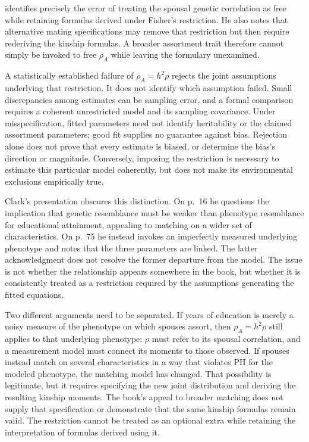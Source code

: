 \citet[p.~19]{Goldberger1978} identifies precisely the error of treating
the spousal genetic correlation as free while retaining formulas
derived under Fisher's restriction. He also notes that alternative
mating specifications may remove that restriction but then require
rederiving the kinship formulas. A broader assortment trait therefore
cannot simply be invoked to free $\rho_A$ while leaving the formulary
unexamined.

A statistically established failure of $\rho_A=h^2\rho$ rejects the
joint assumptions underlying that restriction. It does not identify
which assumption failed. Small discrepancies among estimates can be
sampling error, and a formal comparison requires a coherent unrestricted
model and its sampling covariance. Under misspecification, fitted
parameters need not identify heritability or the claimed assortment
parameters; good fit supplies no guarantee against bias. Rejection
alone does not prove that every estimate is biased, or determine the
bias's direction or magnitude. Conversely, imposing the restriction is
necessary to estimate this particular model coherently, but does not
make its environmental exclusions empirically true.

Clark's presentation obscures this distinction. On p.~16 he questions
the implication that genetic resemblance must be weaker than phenotype
resemblance for educational attainment, appealing to matching on a wider
set of characteristics. On p.~75 he instead invokes an imperfectly
measured underlying phenotype and notes that the three parameters are
linked. The latter acknowledgment does not resolve the former departure
from the model. The issue is not whether the relationship appears
somewhere in the book, but whether it is consistently treated as a
restriction required by the assumptions generating the fitted equations.

Two different arguments need to be separated. If years of education
is merely a noisy measure of the phenotype on which spouses assort,
then $\rho_A=h^2\rho$ still applies to that underlying phenotype:
$\rho$ must refer to its spousal correlation, and a measurement model
must connect its moments to those observed. If spouses instead match
on several characteristics in a way that violates PH for the modeled
phenotype, the matching model has changed. That possibility is legitimate,
but it requires specifying the new joint distribution and deriving the
resulting kinship moments. The book's appeal to broader matching does
not supply that specification or demonstrate that the same kinship
formulas remain valid. The restriction cannot be treated as an optional
extra while retaining the interpretation of formulas derived using it.

